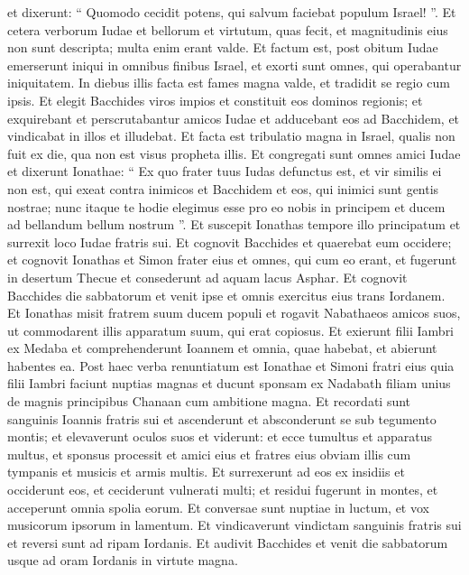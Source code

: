 \begin{biblechapter}
\begin{biblechapter}
\begin{biblechapter}
\begin{biblechapter}
\begin{biblechapter}
\begin{biblechapter}
\begin{biblechapter}
\begin{biblechapter}
\begin{biblechapter}
\verse et dixerunt: “ Quomodo cecidit potens, qui salvum faciebat populum Israel! ”.
 \verse Et cetera verborum Iudae et bellorum et virtutum, quas fecit, et magnitudinis eius non sunt descripta; multa enim erant valde.
 \verse Et factum est, post obitum Iudae emerserunt iniqui in omnibus finibus Israel, et exorti sunt omnes, qui operabantur iniquitatem. 
\verse In diebus illis facta est fames magna valde, et tradidit se regio cum ipsis. 
\verse Et elegit Bacchides viros impios et constituit eos dominos regionis; 
\verse et exquirebant et perscrutabantur amicos Iudae et adducebant eos ad Bacchidem, et vindicabat in illos et illudebat. 
\verse Et facta est tribulatio magna in Israel, qualis non fuit ex die, qua non est visus propheta illis.
 \verse Et congregati sunt omnes amici Iudae et dixerunt Ionathae: 
\verse “ Ex quo frater tuus Iudas defunctus est, et vir similis ei non est, qui exeat contra inimicos et Bacchidem et eos, qui inimici sunt gentis nostrae; 
\verse nunc itaque te hodie elegimus esse pro eo nobis in principem et ducem ad bellandum bellum nostrum ”. 
\verse Et suscepit Ionathas tempore illo principatum et surrexit loco Iudae fratris sui.
 \verse Et cognovit Bacchides et quaerebat eum occidere; 
\verse et cognovit Ionathas et Simon frater eius et omnes, qui cum eo erant, et fugerunt in desertum Thecue et consederunt ad aquam lacus Asphar. 
\verse Et cognovit Bacchides die sabbatorum et venit ipse et omnis exercitus eius trans Iordanem. 
\verse Et Ionathas misit fratrem suum ducem populi et rogavit Nabathaeos amicos suos, ut commodarent illis apparatum suum, qui erat copiosus. 
\verse Et exierunt filii Iambri ex Medaba et comprehenderunt Ioannem et omnia, quae habebat, et abierunt habentes ea. 
\verse Post haec verba renuntiatum est Ionathae et Simoni fratri eius quia filii Iambri faciunt nuptias magnas et ducunt sponsam ex Nadabath filiam unius de magnis principibus Chanaan cum ambitione magna. 
\verse Et recordati sunt sanguinis Ioannis fratris sui et ascenderunt et absconderunt se sub tegumento montis; 
\verse et elevaverunt oculos suos et viderunt: et ecce tumultus et apparatus multus, et sponsus processit et amici eius et fratres eius obviam illis cum tympanis et musicis et armis multis. 
\verse Et surrexerunt ad eos ex insidiis et occiderunt eos, et ceciderunt vulnerati multi; et residui fugerunt in montes, et acceperunt omnia spolia eorum. 
\verse Et conversae sunt nuptiae in luctum, et vox musicorum ipsorum in lamentum. 
\verse Et vindicaverunt vindictam sanguinis fratris sui et reversi sunt ad ripam Iordanis.
 \verse Et audivit Bacchides et venit die sabbatorum usque ad oram Iordanis in virtute magna. 

\end{biblechapter}
\end{biblechapter}
\end{biblechapter}
\end{biblechapter}
\end{biblechapter}
\end{biblechapter}
\end{biblechapter}
\end{biblechapter}
\end{biblechapter}
